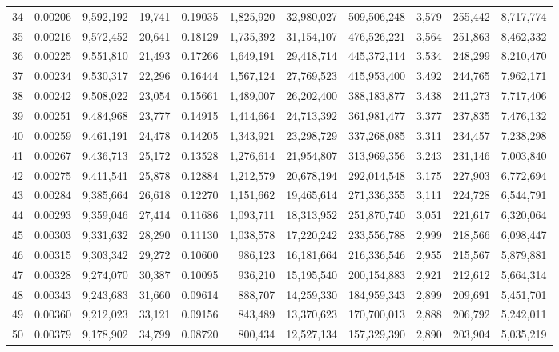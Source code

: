 \begin{landscape}
\begin{longtable}{rrrrrrrrrrr}
34 & 0.00206 & 9,592,192 & 19,741 & 0.19035 & 1,825,920 & 32,980,027 & 509,506,248 & 3,579 & 255,442 & 8,717,774 \\
35 & 0.00216 & 9,572,452 & 20,641 & 0.18129 & 1,735,392 & 31,154,107 & 476,526,221 & 3,564 & 251,863 & 8,462,332 \\
36 & 0.00225 & 9,551,810 & 21,493 & 0.17266 & 1,649,191 & 29,418,714 & 445,372,114 & 3,534 & 248,299 & 8,210,470 \\
37 & 0.00234 & 9,530,317 & 22,296 & 0.16444 & 1,567,124 & 27,769,523 & 415,953,400 & 3,492 & 244,765 & 7,962,171 \\
38 & 0.00242 & 9,508,022 & 23,054 & 0.15661 & 1,489,007 & 26,202,400 & 388,183,877 & 3,438 & 241,273 & 7,717,406 \\
39 & 0.00251 & 9,484,968 & 23,777 & 0.14915 & 1,414,664 & 24,713,392 & 361,981,477 & 3,377 & 237,835 & 7,476,132 \\
40 & 0.00259 & 9,461,191 & 24,478 & 0.14205 & 1,343,921 & 23,298,729 & 337,268,085 & 3,311 & 234,457 & 7,238,298 \\
41 & 0.00267 & 9,436,713 & 25,172 & 0.13528 & 1,276,614 & 21,954,807 & 313,969,356 & 3,243 & 231,146 & 7,003,840 \\
42 & 0.00275 & 9,411,541 & 25,878 & 0.12884 & 1,212,579 & 20,678,194 & 292,014,548 & 3,175 & 227,903 & 6,772,694 \\
43 & 0.00284 & 9,385,664 & 26,618 & 0.12270 & 1,151,662 & 19,465,614 & 271,336,355 & 3,111 & 224,728 & 6,544,791 \\
44 & 0.00293 & 9,359,046 & 27,414 & 0.11686 & 1,093,711 & 18,313,952 & 251,870,740 & 3,051 & 221,617 & 6,320,064 \\
45 & 0.00303 & 9,331,632 & 28,290 & 0.11130 & 1,038,578 & 17,220,242 & 233,556,788 & 2,999 & 218,566 & 6,098,447 \\
46 & 0.00315 & 9,303,342 & 29,272 & 0.10600 & 986,123 & 16,181,664 & 216,336,546 & 2,955 & 215,567 & 5,879,881 \\
47 & 0.00328 & 9,274,070 & 30,387 & 0.10095 & 936,210 & 15,195,540 & 200,154,883 & 2,921 & 212,612 & 5,664,314 \\
48 & 0.00343 & 9,243,683 & 31,660 & 0.09614 & 888,707 & 14,259,330 & 184,959,343 & 2,899 & 209,691 & 5,451,701 \\
49 & 0.00360 & 9,212,023 & 33,121 & 0.09156 & 843,489 & 13,370,623 & 170,700,013 & 2,888 & 206,792 & 5,242,011 \\
50 & 0.00379 & 9,178,902 & 34,799 & 0.08720 & 800,434 & 12,527,134 & 157,329,390 & 2,890 & 203,904 & 5,035,219 \\

\end{longtable}
\end{landscape}

